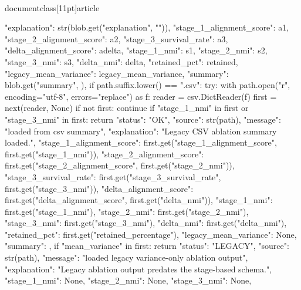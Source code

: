 \\documentclass[11pt]{article}
\begin{document}
\begin{CodeBlock}
{{                    "explanation": str(blob.get("explanation", "")),
                    "stage_1_alignment_score": a1,
                    "stage_2_alignment_score": a2,
                    "stage_3_survival_rate": a3,
                    "delta_alignment_score": adelta,
                    "stage_1_nmi": s1,
                    "stage_2_nmi": s2,
                    "stage_3_nmi": s3,
                    "delta_nmi": delta,
                    "retained_pct": retained,
                    "legacy_mean_variance": legacy_mean_variance,
                    "summary": blob.get("summary", {}),
                }
        if path.suffix.lower() == ".csv":
            try:
                with path.open("r", encoding="utf-8", errors="replace") as f:
                    reader = csv.DictReader(f)
                    first = next(reader, None)
                if not first:
                    continue
                if "stage_1_nmi" in first or "stage_3_nmi" in first:
                    return {
                        "status": "OK",
                        "source": str(path),
                        "message": "loaded from csv summary",
                        "explanation": "Legacy CSV ablation summary loaded.",
                        "stage_1_alignment_score": first.get("stage_1_alignment_score", first.get("stage_1_nmi")),
                        "stage_2_alignment_score": first.get("stage_2_alignment_score", first.get("stage_2_nmi")),
                        "stage_3_survival_rate": first.get("stage_3_survival_rate", first.get("stage_3_nmi")),
                        "delta_alignment_score": first.get("delta_alignment_score", first.get("delta_nmi")),
                        "stage_1_nmi": first.get("stage_1_nmi"),
                        "stage_2_nmi": first.get("stage_2_nmi"),
                        "stage_3_nmi": first.get("stage_3_nmi"),
                        "delta_nmi": first.get("delta_nmi"),
                        "retained_pct": first.get("retained_percentage"),
                        "legacy_mean_variance": None,
                        "summary": {},
                    }
                if "mean_variance" in first:
                    return {
                        "status": "LEGACY",
                        "source": str(path),
                        "message": "loaded legacy variance-only ablation output",
                        "explanation": "Legacy ablation output predates the stage-based schema.",
                        "stage_1_nmi": None,
                        "stage_2_nmi": None,
                        "stage_3_nmi": None,
}}
\end{CodeBlock}
\end{document}
